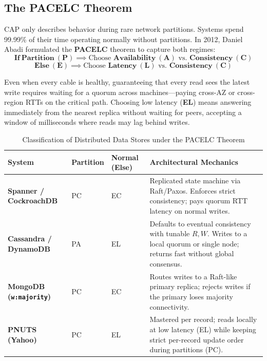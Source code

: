 \subsection{The PACELC Theorem}

CAP only describes behavior during rare network partitions. Systems spend 99.99\% of their time operating normally without partitions. In 2012, Daniel Abadi formulated the \textbf{PACELC} theorem to capture both regimes:
\begin{equation}
\mathbf{If\ Partition\ (P)} \implies \text{Choose } \mathbf{Availability\ (A)} \text{ vs.\ } \mathbf{Consistency\ (C)}
\end{equation}
\begin{equation}
\mathbf{Else\ (E)} \implies \text{Choose } \mathbf{Latency\ (L)} \text{ vs.\ } \mathbf{Consistency\ (C)}
\end{equation}

\begin{intuitionbox}
Even when every cable is healthy, guaranteeing that every read sees the latest write requires waiting for a quorum across machines---paying cross-AZ or cross-region RTTs on the critical path. Choosing low latency (\textbf{EL}) means answering immediately from the nearest replica without waiting for peers, accepting a window of milliseconds where reads may lag behind writes.
\end{intuitionbox}

\begin{table}[htbp]
\centering\small
\begin{tabular}{lllp{6.0cm}}
\toprule
\textbf{System} & \textbf{Partition} & \textbf{Normal (Else)} & \textbf{Architectural Mechanics} \\
\midrule
\textbf{Spanner / CockroachDB} & PC & EC & Replicated state machine via Raft/Paxos. Enforces strict consistency; pays quorum RTT latency on normal writes. \\
\textbf{Cassandra / DynamoDB} & PA & EL & Defaults to eventual consistency with tunable $R, W$. Writes to a local quorum or single node; returns fast without global consensus. \\
\textbf{MongoDB (\texttt{w:majority})} & PC & EC & Routes writes to a Raft-like primary replica; rejects writes if the primary loses majority connectivity. \\
\textbf{PNUTS (Yahoo)} & PC & EL & Mastered per record; reads locally at low latency (EL) while keeping strict per-record update order during partitions (PC). \\
\bottomrule
\end{tabular}
\caption{Classification of Distributed Data Stores under the PACELC Theorem}
\label{tab:v4-ch02-pacelc}
\end{table}

